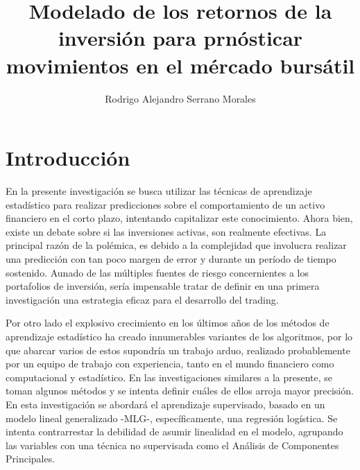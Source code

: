 \documentclass[a4paper,12pt]{Latex/Classes/PhDthesisPSnPDF}
\title{Modelado de los retornos de la inversión para prnósticar movimientos en el mércado bursátil}
\author{Rodrigo Alejandro Serrano Morales}
\begin{document}


\maketitle									%

\newpage\renewcommand{\thepage}{\arabic{page}}\setcounter{page}{1} 


\tableofcontents
\listoffigures
\listoftables



\chapter*{Introducción}

En la presente investigación se busca utilizar las técnicas de aprendizaje estadístico para realizar predicciones sobre el comportamiento de un activo financiero en el corto  plazo, intentando capitalizar este conocimiento. Ahora bien, existe un debate sobre si las inversiones activas, son realmente efectivas. La principal razón de la polémica, es debido a la complejidad que involucra realizar una predicción con tan poco margen de error y durante un período de tiempo sostenido. Aunado de las múltiples fuentes de riesgo concernientes a los portafolios de inversión, sería impensable tratar de definir en una primera investigación una estrategia eficaz para el desarrollo del trading.

Por otro lado el explosivo crecimiento en los últimos años de los métodos de aprendizaje estadístico ha creado innumerables variantes de los algoritmos, por lo que abarcar varios de estos supondría un trabajo arduo, realizado probablemente por un equipo de trabajo con experiencia, tanto en el mundo financiero como computacional y estadístico. En las investigaciones similares a la presente, se toman algunos métodos y se intenta definir cuáles de ellos arroja mayor precisión. En esta investigación se abordará el aprendizaje supervisado, basado en un modelo lineal generalizado -MLG-, específicamente, una regresión logística. Se intenta contrarrestar la debilidad de asumir linealidad en el modelo, agrupando las variables con una técnica no supervisada como el Análisis de Componentes Principales.
\end{document}
